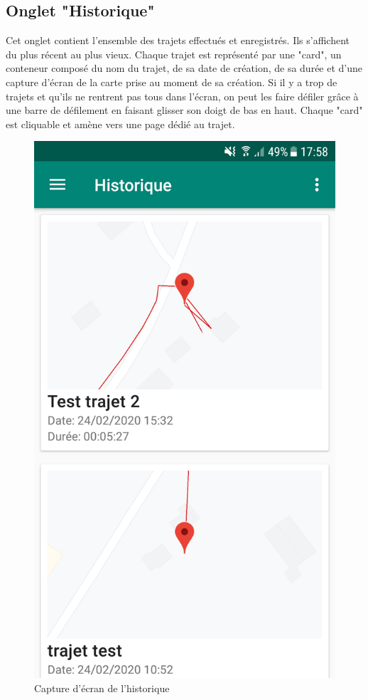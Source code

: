 \subsection{Onglet "Historique"}
Cet onglet contient l'ensemble des trajets effectués et enregistrés. Ils s'affichent du plus récent au plus vieux. Chaque trajet est représenté
par une "card", un conteneur composé du nom du trajet, de sa date de création, de sa durée et d'une capture d'écran de la carte prise au moment
de sa création. Si il y a trop de trajets et qu'ils ne rentrent pas tous dans l'écran, on peut les faire défiler grâce à une barre de défilement
en faisant glisser son doigt de bas en haut. Chaque "card" est cliquable et amène vers une page dédié au trajet.
\begin{figure}[ht]
  \label{Historique}
  \centering
  \includegraphics[scale=0.13]{images/historique.png}
  \caption{Capture d'écran de l'historique}
\end{figure}

